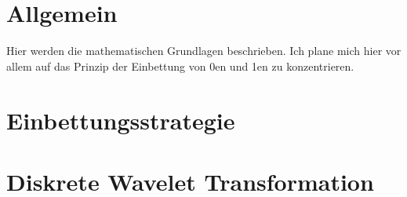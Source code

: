 
\section{Allgemein}

Hier werden die mathematischen Grundlagen beschrieben. Ich plane mich hier vor allem auf das Prinzip der Einbettung von 0en und 1en zu konzentrieren. 

\section{Einbettungsstrategie}


\section{Diskrete Wavelet Transformation}
